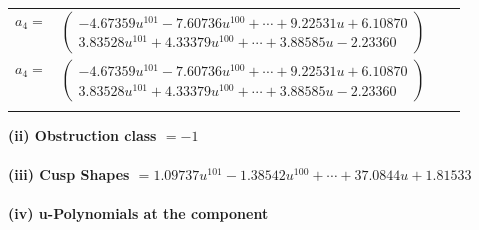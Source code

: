 \documentclass[1p]{elsarticle_modified}
\theoremstyle{definition}
\begin{document}
\begin{tabular}{m{7pt} m{180pt} m{7pt} m{180pt} }
\flushright $a_{4}=$&$\begin{pmatrix}-4.67359 u^{101}-7.60736 u^{100}+\cdots+9.22531 u+6.10870\\3.83528 u^{101}+4.33379 u^{100}+\cdots+3.88585 u-2.23360\end{pmatrix}$\\ \flushright $a_{4}=$&$\begin{pmatrix}-4.67359 u^{101}-7.60736 u^{100}+\cdots+9.22531 u+6.10870\\3.83528 u^{101}+4.33379 u^{100}+\cdots+3.88585 u-2.23360\end{pmatrix}$\\&\end{tabular}
\flushleft \textbf{(ii) Obstruction class $= -1$}\\~\\
\flushleft \textbf{(iii) Cusp Shapes $= 1.09737 u^{101}-1.38542 u^{100}+\cdots+37.0844 u+1.81533$}\\~\\
\newpage\renewcommand{\arraystretch}{1}
\flushleft \textbf{(iv) u-Polynomials at the component}\newline \\
\end{document}
